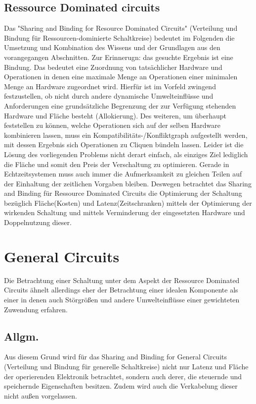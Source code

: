 \documentclass[conference]{IEEEtran}
\begin{document}
\subsection{Ressource Dominated circuits}
Das "Sharing and Binding for Resource Dominated Circuits" (Verteilung und Bindung für Ressourcen-dominierte Schaltkreise) bedeutet im Folgenden die Umsetzung und Kombination des Wissens und der Grundlagen aus den vorangegangen Abschnitten.
Zur Erinnerugn: das gesuchte Ergebnis ist eine Bindung. Das bedeutet eine Zuordnung von tatsächlicher Hardware und Operationen in denen eine maximale Menge an Operationen einer minimalen Menge an Hardware zugeordnet wird. Hierfür ist im Vorfeld zwingend festzustellen, ob nicht durch andere dynamische Umwelteinflüsse und Anforderungen eine grundsätzliche Begrenzung der zur Verfügung stehenden Hardware und Fläche besteht (Allokierung). Des weiteren, um überhaupt feststellen zu können, welche Operationen sich auf der selben Hardware kombinieren lassen, muss ein Kompatibilitäts-/Konfliktgraph aufgestellt werden, mit dessen Ergebnis sich Operationen zu Cliquen bündeln lassen.
Leider ist die Lösung des vorliegenden Problems nicht derart einfach, als einziges Ziel lediglich die Fläche und somit den Preis der Verschaltung zu optimieren. Gerade in Echtzeitsystemen muss auch immer die Aufmerksamkeit zu gleichen Teilen auf der Einhaltung der zeitlichen Vorgaben bleiben.
Deswegen betrachtet das Sharing and Binding für Ressource Dominated Circuits die Optimierung der Schaltung bezüglich Fläche(Kosten) und  Latenz(Zeitschranken) mittels der Optimierung der wirkenden Schaltung und mittels Verminderung der eingesetzten Hardware und Doppelnutzung dieser.\cite[S. 156]{3} 









\section{General Circuits}
Die Betrachtung einer Schaltung unter dem Aspekt der Ressource Dominated Circuits ähnelt allerdings eher der Betrachtung einer idealen Komponente als einer in denen auch Störgrößen und andere Umwelteinflüsse einer gewichteten Zuwendung erfahren.
\subsection{Allgm.}
Aus diesem Grund wird für das Sharing and Binding for General Circuits (Verteilung und Bindung für generelle Schaltkreise) nicht nur Latenz und Fläche der operierenden Elektronik betrachtet, sondern auch derer, die steuernde und speichernde Eigenschaften besitzen. Zudem wird auch die Verkabelung dieser nicht außen vorgelassen.\cite[S. 156]{3}
\end{document}

